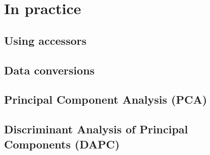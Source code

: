 \documentclass{article}
\begin{document}
\section{In practice}

\subsection{Using accessors}



\subsection{Data conversions}




\subsection{Principal Component Analysis (PCA)}



\subsection{Discriminant Analysis of Principal Components (DAPC)}
\end{document}

